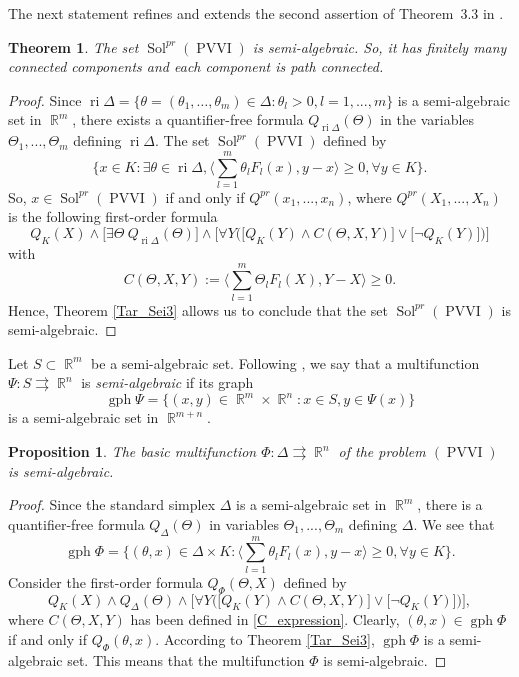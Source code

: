 \documentclass[]{interact}
\theoremstyle{plain}%
\newtheorem{theorem}{Theorem}[section]
\newtheorem{proposition}{Proposition}[section]
\theoremstyle{definition}
\DeclareMathOperator{\gph}{gph}
\DeclareMathOperator{\Sol}{Sol}
\DeclareMathOperator{\PVVI}{PVVI}
\DeclareMathOperator{\ri}{ri}
\DeclareMathOperator{\R}{\mathbb{R}}
\begin{document}
The next statement refines and extends the second assertion of Theorem~3.3 in \cite{HYY2015b}. 

\begin{theorem}\label{finite_pr} The set $\Sol^{pr}(\PVVI)$ is semi-algebraic. So, it has finitely many connected components and each component is path connected.
\end{theorem}
\begin{proof} Since $\ri\Delta=\big\{\theta=(\theta_1,\dots,\theta_m)\in\Delta: \theta_l>0,l=1,...,m\big\}$ is a semi-algebraic set in $\R^m$, there exists a quantifier-free formula $Q_{\ri\Delta}(\Theta)$ in the variables $\Theta_1,...,\Theta_m$ defining $\ri\Delta.$
The set $\Sol^{pr}(\PVVI)$ defined by
 $$\Big\lbrace  x\in K:\exists\theta\in\ri\Delta, \Big\langle  \sum_{l=1}^m\theta_lF_l(x),y-x\Big\rangle  \geq 0, \forall y\in
	K \Big\rbrace .$$
	So, $x\in \Sol^{pr}(\PVVI)$ if and only if $Q^{pr}(x_1,...,x_n)$, where $Q^{pr}(X_1,...,X_n)$ is the following first-order formula
	$$Q_K(X) \wedge\Big[ \exists \Theta\ Q_{\ri\Delta}(\Theta)\Big]  \wedge \Big[ \forall Y \Big(\big[ Q_K(Y) \wedge C(\Theta,X,Y)\big]\vee \big[ \neg Q_K(Y)\big] \Big)\Big]$$
	with 
	\begin{equation}\label{C_expression}
	C(\Theta,X,Y):=\Big\langle  \sum_{l=1}^m\Theta_lF_l(X),Y-X\Big\rangle \geq 0.
	\end{equation}
	Hence, Theorem \ref{Tar_Sei3} allows us to conclude that the set $\Sol^{pr}(\PVVI)$ is semi-algebraic.
\end{proof}

Let $S\subset \R^m$ be a semi-algebraic set. Following \cite{DL2013}, we say that a multifunction $\Psi: S\rightrightarrows \R^n$ is \textit{semi-algebraic} if its graph
$$\gph \Psi=\big\{(x,y)\in \R^m\times \R^n: x\in S, y\in \Psi(x)\big\}$$
is a semi-algebraic set in  $\R^{m+n}$.
\begin{proposition}%
The basic multifunction $\Phi:\Delta \rightrightarrows \R^n$ of the problem $(\PVVI)$ is semi-algebraic. 
\end{proposition}
\begin{proof} Since the standard simplex  $\Delta$ is a semi-algebraic set in $\R^m$, there is a quantifier-free formula $Q_{\Delta}(\Theta)$ in variables $\Theta_1,...,\Theta_m$ defining $\Delta.$	We see that
	$$\gph\Phi=\Big\lbrace  (\theta,x)\in \Delta\times K:\Big\langle  \sum_{l=1}^m\theta_lF_l(x),y-x\Big\rangle  \geq 0,\forall y\in
	K \Big\rbrace.$$
	Consider the first-order formula $Q_{\Phi}(\Theta,X)$ defined by	
	$$Q_K(X) \wedge Q_{\Delta}(\Theta) \wedge \Big[ \forall Y \Big(  \big[ Q_K(Y) \wedge C(\Theta,X,Y) \big]\vee \big[ \neg Q_K(Y)\big] \Big)\Big] ,$$
	where $C(\Theta,X,Y)$ has been defined in \eqref{C_expression}.	Clearly, $(\theta,x)\in \gph\Phi$ if and only if $Q_{\Phi}(\theta,x)$. According to Theorem \ref{Tar_Sei3}, $\gph\Phi$ is a semi-algebraic set. This means that the multifunction $\Phi$ is semi-algebraic.
\end{proof}
\end{document}
